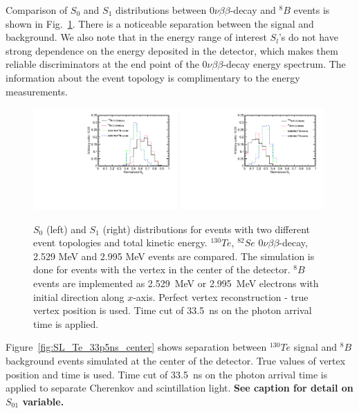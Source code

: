 \documentclass[12pt,twoside,letterpaper]{article}
\newcommand{\vbb}{0\nu\beta\beta}
\newcommand{\Te}{^{130}Te}
\newcommand{\B}{^{8}B}
\begin{document}
Comparison of $S_0$ and $S_1$ distributions between $\vbb$-decay and $\B$ events is shown in Fig.~\ref{fig:S_vs_energy}. There is a noticeable separation between the signal and background. We also note that in the energy range of interest $S_l$'s do not have strong dependence on the energy deposited in the detector, which makes them reliable discriminators at the end point of the $\vbb$-decay energy spectrum. The information about the event topology is complimentary to the energy measurements.

\begin{figure}[htb]
\centering
\includegraphics[angle=0,width=0.49\textwidth]{plots/hS0.pdf}
\includegraphics[angle=0,width=0.49\textwidth]{plots/hS1.pdf}
\caption{$S_0$ (left) and $S_1$ (right) distributions for events with two different event topologies and total kinetic energy. $^{130}Te$, $^{82}Se$ $\vbb$-decay, 2.529 MeV and 2.995 MeV events are compared. The simulation is done for events with the vertex in the center of the detector. $\B$ events are implemented as 2.529~MeV or 2.995~MeV electrons with initial direction along $x$-axis. Perfect vertex reconstruction - true vertex position is used. Time cut of 33.5~ns on the photon arrival time is applied.}
\label{fig:S_vs_energy}
\end{figure}


Figure~\ref{fig:SL_Te_33p5ns_center} shows separation between $\Te$ signal and $\B$ background events simulated at the center of the detector. True values of vertex position and time is used. Time cut of 33.5~ns on the photon arrival time is applied to separate Cherenkov and scintillation light. {\bf See caption for detail on $S_{01}$ variable.}
\end{document}
